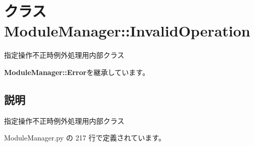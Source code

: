 \section{クラス ModuleManager::InvalidOperation}
\label{classsource__py_1_1_module_manager_1_1_module_manager_1_1_invalid_operation}
指定操作不正時例外処理用内部クラス  


{\bf ModuleManager::Error}を継承しています。



\subsection{説明}
指定操作不正時例外処理用内部クラス 

 ModuleManager.py の 217 行で定義されています。